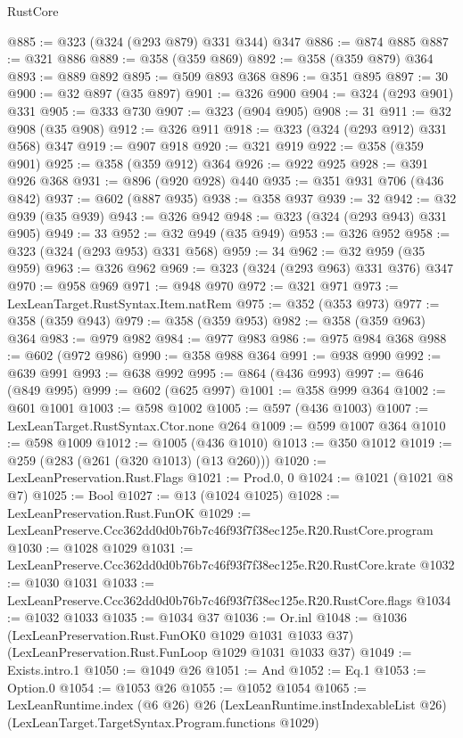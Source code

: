 \begin{lexlean}{RustCore}
\begin{coremodule}
@885 := @323 (@324 (@293 @879) @331 @344) @347
@886 := @874 @885
@887 := @321 @886
@889 := @358 (@359 @869)
@892 := @358 (@359 @879) @364
@893 := @889 @892
@895 := @509 @893 @368
@896 := @351 @895
@897 := 30
@900 := @32 @897 (@35 @897)
@901 := @326 @900
@904 := @324 (@293 @901) @331
@905 := @333 @730
@907 := @323 (@904 @905)
@908 := 31
@911 := @32 @908 (@35 @908)
@912 := @326 @911
@918 := @323 (@324 (@293 @912) @331 @568) @347
@919 := @907 @918
@920 := @321 @919
@922 := @358 (@359 @901)
@925 := @358 (@359 @912) @364
@926 := @922 @925
@928 := @391 @926 @368
@931 := @896 (@920 @928) @440
@935 := @351 @931 @706 (@436 @842)
@937 := @602 (@887 @935)
@938 := @358 @937
@939 := 32
@942 := @32 @939 (@35 @939)
@943 := @326 @942
@948 := @323 (@324 (@293 @943) @331 @905)
@949 := 33
@952 := @32 @949 (@35 @949)
@953 := @326 @952
@958 := @323 (@324 (@293 @953) @331 @568)
@959 := 34
@962 := @32 @959 (@35 @959)
@963 := @326 @962
@969 := @323 (@324 (@293 @963) @331 @376) @347
@970 := @958 @969
@971 := @948 @970
@972 := @321 @971
@973 := LexLeanTarget.RustSyntax.Item.natRem
@975 := @352 (@353 @973)
@977 := @358 (@359 @943)
@979 := @358 (@359 @953)
@982 := @358 (@359 @963) @364
@983 := @979 @982
@984 := @977 @983
@986 := @975 @984 @368
@988 := @602 (@972 @986)
@990 := @358 @988 @364
@991 := @938 @990
@992 := @639 @991
@993 := @638 @992
@995 := @864 (@436 @993)
@997 := @646 (@849 @995)
@999 := @602 (@625 @997)
@1001 := @358 @999 @364
@1002 := @601 @1001
@1003 := @598 @1002
@1005 := @597 (@436 @1003)
@1007 := LexLeanTarget.RustSyntax.Ctor.none @264
@1009 := @599 @1007 @364
@1010 := @598 @1009
@1012 := @1005 (@436 @1010)
@1013 := @350 @1012
@1019 := @259 (@283 (@261 (@320 @1013) (@13 @260)))
@1020 := LexLeanPreservation.Rust.Flags
@1021 := Prod.{0, 0}
@1024 := @1021 (@1021 @8 @7)
@1025 := Bool
@1027 := @13 (@1024 @1025)
@1028 := LexLeanPreservation.Rust.FunOK
@1029 := LexLeanPreserve.Ccc362dd0d0b76b7c46f93f7f38ec125e.R20.RustCore.program
@1030 := @1028 @1029
@1031 := LexLeanPreserve.Ccc362dd0d0b76b7c46f93f7f38ec125e.R20.RustCore.krate
@1032 := @1030 @1031
@1033 := LexLeanPreserve.Ccc362dd0d0b76b7c46f93f7f38ec125e.R20.RustCore.flags
@1034 := @1032 @1033
@1035 := @1034 @37
@1036 := Or.inl
@1048 := @1036
    (LexLeanPreservation.Rust.FunOK0 @1029 @1031 @1033 @37)
    (LexLeanPreservation.Rust.FunLoop @1029 @1031 @1033 @37)
@1049 := Exists.intro.{1}
@1050 := @1049 @26
@1051 := And
@1052 := Eq.{1}
@1053 := Option.{0}
@1054 := @1053 @26
@1055 := @1052 @1054
@1065 := LexLeanRuntime.index
    (@6 @26)
    @26
    (LexLeanRuntime.instIndexableList @26)
    (LexLeanTarget.TargetSyntax.Program.functions @1029)

\end{coremodule}
\end{lexlean}
